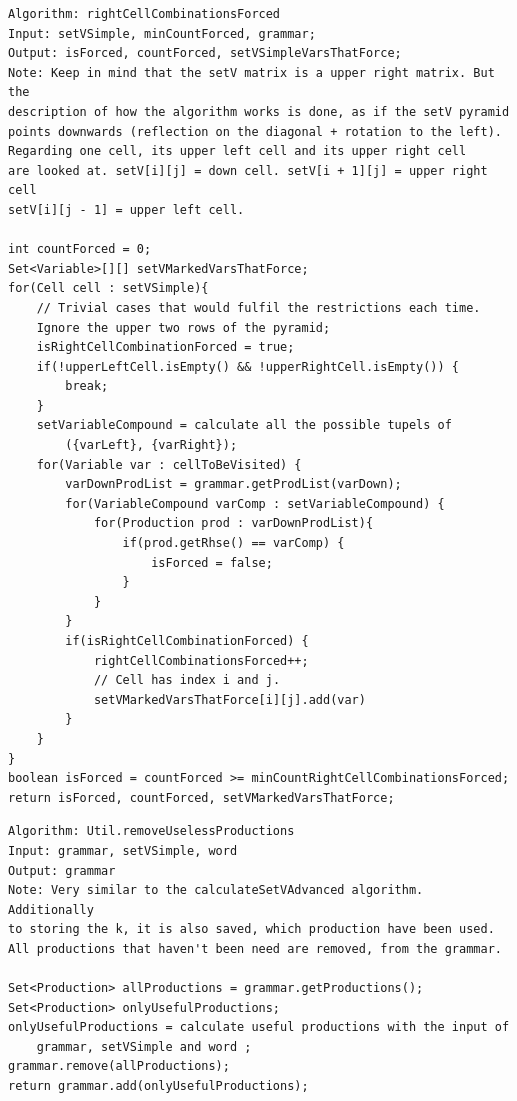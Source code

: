 \pagebreak

\lstset{language=java}
\begin{lstlisting}[frame=htrbl, caption={rightCellCombinationsForced}, 
label={lst:rightCellCombinationsForced}]
Algorithm: rightCellCombinationsForced
Input: setVSimple, minCountForced, grammar;
Output: isForced, countForced, setVSimpleVarsThatForce;
Note: Keep in mind that the setV matrix is a upper right matrix. But the
description of how the algorithm works is done, as if the setV pyramid 
points downwards (reflection on the diagonal + rotation to the left).
Regarding one cell, its upper left cell and its upper right cell 
are looked at. setV[i][j] = down cell. setV[i + 1][j] = upper right cell
setV[i][j - 1] = upper left cell.

int countForced = 0;
Set<Variable>[][] setVMarkedVarsThatForce;
for(Cell cell : setVSimple){
	// Trivial cases that would fulfil the restrictions each time. 
	Ignore the upper two rows of the pyramid; 
	isRightCellCombinationForced = true;
	if(!upperLeftCell.isEmpty() && !upperRightCell.isEmpty()) {
		break;
	}
	setVariableCompound = calculate all the possible tupels of 
		({varLeft}, {varRight});
	for(Variable var : cellToBeVisited) {
		varDownProdList = grammar.getProdList(varDown);
		for(VariableCompound varComp : setVariableCompound) {
			for(Production prod : varDownProdList){
				if(prod.getRhse() == varComp) {
					isForced = false;
				}
			}
		}
		if(isRightCellCombinationForced) {
			rightCellCombinationsForced++;
			// Cell has index i and j.
			setVMarkedVarsThatForce[i][j].add(var)
		}
	}
}
boolean isForced = countForced >= minCountRightCellCombinationsForced;
return isForced, countForced, setVMarkedVarsThatForce;
\end{lstlisting}

\pagebreak

\lstset{language=java}
\begin{lstlisting}[frame=htrbl, caption={Util.removeUselessProductions}, 
label={lst:Util.removeUselessProductions}]
Algorithm: Util.removeUselessProductions
Input: grammar, setVSimple, word
Output: grammar
Note: Very similar to the calculateSetVAdvanced algorithm. Additionally
to storing the k, it is also saved, which production have been used. 
All productions that haven't been need are removed, from the grammar.

Set<Production> allProductions = grammar.getProductions();
Set<Production> onlyUsefulProductions;
onlyUsefulProductions = calculate useful productions with the input of
	grammar, setVSimple and word ;
grammar.remove(allProductions);
return grammar.add(onlyUsefulProductions);
\end{lstlisting}

\pagebreak